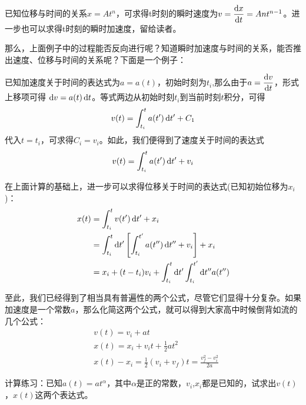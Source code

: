 \subsection[质点运动学有关的计算]{}
\eg 已知位移与时间的关系$x=At^{n} $，可求得t时刻的瞬时速度为$v=\dfrac{\dif  x}{\dif  t} =Ant^{n-1} $。进一步也可以求得t时刻的瞬时加速度，留给读者。

那么，上面例子中的过程能否反向进行呢？知道瞬时加速度与时间的关系，能否推出速度、位移与时间的关系呢？下面是一个例子：

已知加速度关于时间的表达式为$a=a(t)$，初始时刻为$t_{i} $,那么由于$a=\dfrac{\dif  v}{\dif  t}$，形式上移项可得 $\dif  v=a(t)\dif  t$。等式两边从初始时刻$t_{i}$到当前时刻$t$积分，可得
\[v(t)=\int_{t_{i}}^{t}a(t') \dif  t'+C_{1}\]
代入$t=t_{i}$，可求得$C_{i}=v_{i}$。如此，我们便得到了速度关于时间的表达式
\[v(t)=\int_{t_{i}}^{t}a(t')\dif  t'+v_{i}\]

在上面计算的基础上，进一步可以求得位移关于时间的表达式(已知初始位移为$x_{i}$)：
\begin{equation}
    \begin{aligned}
        x(t) & =\int_{t_{i}}^{t}v(t')\dif  t'+x_{i}                                                \\
             & =\int_{t_{i}}^{t} \dif  t'\left[\int_{t_{i}}^{t'}a(t'')\dif  t''+v_{i}\right]+x_{i} \\
             & =x_{i}+(t-t_{i})v_{i}+\int_{t_{i}}^{t}\dif  t'\int_{t_{i}}^{t'}\dif  t''a(t'')
    \end{aligned}
    \nonumber
\end{equation}

至此，我们已经得到了相当具有普遍性的两个公式，尽管它们显得十分复杂。如果加速度是一个常数$a$，那么化简这两个公式，就可以得到大家高中时候倒背如流的几个公式：
\begin{equation}
    \begin{aligned}
         & v(t)=v_{i}+at                                                         \\
         & x(t)=x_{i}+v_{i}t+\frac{1}{2}at^{2}                                   \\
         & x(t)-x_{i}= \frac{1}{2} (v_{i}+v_{f})t=\frac{v_{f}^{2}-v_{i}^{2}}{2a}
    \end{aligned}
    \nonumber
\end{equation}

计算练习：已知$a(t)=at^{\alpha }$，其中$\alpha$是正的常数，$v_{i}$,$x_{i}$都是已知的，试求出$v(t)$，$x(t)$这两个表达式。
